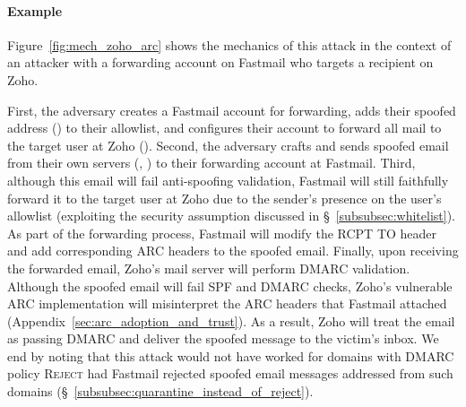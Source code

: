 \paragraph{Example}
Figure~\ref{fig:mech_zoho_arc} shows the mechanics of this attack
in the context of an attacker with a forwarding account on Fastmail who targets a recipient on Zoho.

First,
the adversary creates a Fastmail account for forwarding, adds their spoofed address
() to their allowlist, and configures their
account to forward all mail to the target user at Zoho
().
Second, the adversary crafts and sends
spoofed email from their own servers (\eg, )
to their forwarding account at Fastmail.
Third, although this email will fail anti-spoofing validation, Fastmail will still faithfully forward it to the target user at Zoho due to the sender's presence on the user's allowlist (exploiting the security assumption discussed in \S~\ref{subsubsec:whitelist}). 
As part of the forwarding process,
Fastmail will modify the RCPT TO header and add corresponding ARC headers to the
spoofed email.
Finally, upon receiving the forwarded email, Zoho's mail server will perform DMARC validation.
Although the spoofed email will fail SPF and DMARC checks,
Zoho's vulnerable ARC implementation
will misinterpret the ARC headers that Fastmail attached (Appendix~\ref{sec:arc_adoption_and_trust}).
As a result, Zoho will treat the email as passing
DMARC and deliver the spoofed message to the victim's inbox. We end by noting that this attack would not have worked for domains with DMARC policy \textsc{Reject} had Fastmail rejected spoofed email messages addressed from such domains (\S~\ref{subsubsec:quarantine_instead_of_reject}).


